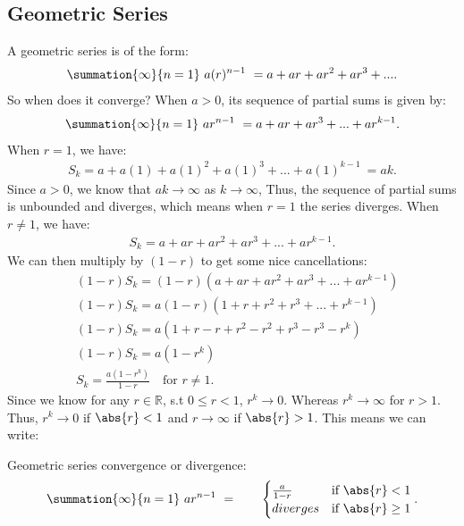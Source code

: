\documentclass{report}
\begin{document}
    \subsection*{Geometric Series}
    \bigbreak \noindent
    A geometric series is of the form:
    \begin{align*}
        \summation{\infty}{n=1}\ a(r)^{n-1}\  = a + ar + ar^{2} + ar^{3} + ... 
    .\end{align*}
    \bigbreak \noindent 
    So when does it converge? When $a>0$, its sequence of partial sums is given by:
    \begin{align*}
        \summation{\infty}{n=1}\ ar^{n-1}\  = a + ar + ar^{3} + ... + ar^{k-1}
    .\end{align*}
    \bigbreak \noindent 
    When $r=1$, we have:
    \begin{align*}
        S_{k} =  a + a(1) + a(1)^{2} + a(1)^{3}  +... + a(1)^{k-1}\  = ak
    .\end{align*}
    \bigbreak \noindent 
    Since $a>0$, we know that $ak \to \infty$ as $k \to \infty$, Thus, the sequence of partial sums is unbounded and diverges, which means when $r=1$ the series diverges. When $r \ne 1$, we have:
    \begin{align*}
        S_{k} = a + ar + ar^{2} + ar^{3} + ... + ar^{k-1}
    .\end{align*}
    \bigbreak \noindent 
    We can then multiply by $(1-r)$ to get some nice cancellations:
    \begin{align*}
        &(1-r)S_{k} = (1-r)(a + ar + ar^{2} + ar^{3} +... + ar^{k-1}) \\
        &(1-r)S_{k} = a(1-r)(1 + r + r^{2} + r^{3} + ... +r^{k-1}) \\
        &(1-r)S_{k} = a(1 + r -r + r^{2} - r^{2} + r^{3} - r^{3} - r^{k}) \\
        &(1-r)S_{k} = a(1-r^{k}) \\
        &S_{k} = \frac{a(1-r^{k})}{1-r} \quad \text{for $r\ne 1$}
    .\end{align*}
    \bigbreak \noindent 
    Since we know for any $r \in \mathbb{R}$, s.t $0 \leq r < 1$, $r^{k} \to 0$. Whereas $r^{k} \to \infty$ for $r>1 $. Thus, $r^{k} \to 0$ if $\abs{r} < 1$ and $r \to \infty$ if $\abs{r} > 1$. This means we can write:
    \begin{definition}
        Geometric series convergence or divergence: 
    \begin{align*}
       \summation{\infty}{n=1}\ ar^{n-1} \  = \quad \quad 
                \begin{cases}
                     \frac{a}{1-r} & \text{if }  \abs{r} < 1\\
                     diverges & \text{if }  \abs{r} \geq 1
                \end{cases}
    .\end{align*}
    \end{definition}
\end{document}
